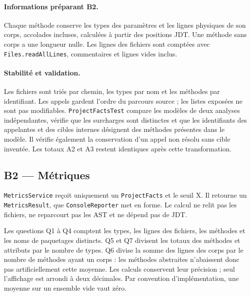 \documentclass[11pt,a4paper]{article}
\newcommand{\code}[1]{\texttt{#1}}
\begin{document}
\paragraph{Informations préparant B2.}
Chaque méthode conserve les types des paramètres et les lignes physiques de son corps, accolades incluses, calculées à partir des positions JDT. Une méthode sans corps a une longueur nulle. Les lignes des fichiers sont comptées avec \code{Files.readAllLines}, commentaires et lignes vides inclus.

\paragraph{Stabilité et validation.}
Les fichiers sont triés par chemin, les types par nom et les méthodes par identifiant. Les appels gardent l'ordre du parcours source ; les listes exposées ne sont pas modifiables. \code{ProjectFactsTest} compare les modèles de deux analyses indépendantes, vérifie que les surcharges sont distinctes et que les identifiants des appelantes et des cibles internes désignent des méthodes présentes dans le modèle. Il vérifie également la conservation d'un appel non résolu sans cible inventée. Les totaux A2 et A3 restent identiques après cette transformation.

\subsection{B2 --- Métriques}
\code{MetricsService} reçoit uniquement un \code{ProjectFacts} et le seuil X. Il retourne un \code{MetricsResult}, que \code{ConsoleReporter} met en forme. Le calcul ne relit pas les fichiers, ne reparcourt pas les AST et ne dépend pas de JDT.

Les questions Q1 à Q4 comptent les types, les lignes des fichiers, les méthodes et les noms de paquetages distincts. Q5 et Q7 divisent les totaux des méthodes et attributs par le nombre de types. Q6 divise la somme des lignes des corps par le nombre de méthodes ayant un corps : les méthodes abstraites n'abaissent donc pas artificiellement cette moyenne. Les calculs conservent leur précision ; seul l'affichage est arrondi à deux décimales. Par convention d'implémentation, une moyenne sur un ensemble vide vaut zéro.
\end{document}
